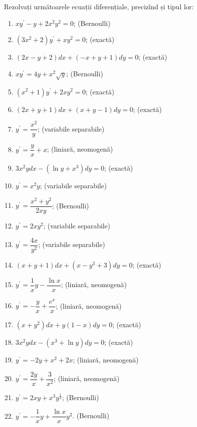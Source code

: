 Rezolvați următoarele ecuații diferențiale, precizînd și tipul lor:
\begin{enumerate}[(1)]
  \item $xy^\prime - y + 2x^2 y^2 = 0 $; \hfill(Bernoulli)
  \item $ (3x^2 + 2)y^\prime + xy^2 = 0 $; \hfill(exactă)
  \item $(2x - y + 2) dx + (-x + y + 1) dy = 0 $; \hfill(exactă)
  \item $ xy^\prime = 4y + x^2 \sqrt{y} $; \hfill(Bernoulli)
  \item $ (x^2 + 1) y^\prime + 2xy^2 = 0 $; \hfill(exactă)
  \item $ (2x + y + 1) dx + (x + y - 1) dy = 0 $; \hfill(exactă)
  \item $ y^\prime = \dfrac{x^2}{y} $; \hfill(variabile separabile)
  \item $ y^\prime = \dfrac{y}{x} + x $; \hfill(liniară, neomogenă)
  \item $ 3x^2 y dx - (\ln y + x^3) dy = 0 $; \hfill(exactă)
  \item $ y^\prime = x^2 y $; \hfill(variabile separabile)
  \item $ y^\prime = \dfrac{x^2 + y^2}{2xy} $; \hfill(Bernoulli)
  \item $ y^\prime = 2xy^2 $; \hfill(variabile separabile)
  \item $ y^\prime = \dfrac{4x}{y^2} $; \hfill(variabile separabile)
  \item $ (x + y + 1)dx + (x - y^3 + 3) dy = 0 $; \hfill(exactă)
  \item $ y^\prime = \dfrac{1}{x}y - \dfrac{\ln x}{x} $; \hfill(liniară, neomogenă)
  \item $ y^\prime = -\dfrac{y}{x} + \dfrac{e^x}{x} $; \hfill(liniară, neomogenă)
  \item $ (x + y^2) dx + y(1 - x)dy = 0 $; \hfill(exactă)
  \item $ 3x^2 y dx - (x^3 + \ln y) dy = 0 $; \hfill(exactă)
  \item $ y^\prime = -2y + x^2 + 2x $; \hfill(liniară, neomogenă)
  \item $ y^\prime = \dfrac{2y}{x} + \dfrac{3}{x^2} $; \hfill(liniară, neomogenă)
  \item $ y^\prime = 2xy + x^3 y^{\frac{1}{2}} $; \hfill(Bernoulli)
  \item $ y^\prime = -\dfrac{1}{x}y + \dfrac{\ln x}{x} y^2 $. \hfill(Bernoulli)
\end{enumerate}


